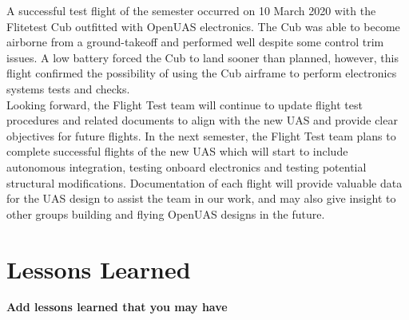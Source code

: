 \documentclass{article}
\begin{document}
A successful test flight of the semester occurred on 10 March 2020 with the Flitetest Cub outfitted with OpenUAS electronics. The Cub was able to become airborne from a ground-takeoff and performed well despite some control trim issues. A low battery forced the Cub to land sooner than planned, however, this flight confirmed the possibility of using the Cub airframe to perform electronics systems tests and checks.\\

Looking forward, the Flight Test team will continue to update flight test procedures and related documents to align with the new UAS and provide clear objectives for future flights. In the next semester, the Flight Test team plans to complete successful flights of the new UAS which will start to include autonomous integration, testing onboard electronics and testing potential structural modifications. Documentation of each flight will provide valuable data for the UAS design to assist the team in our work, and may also give insight to other groups building and flying OpenUAS designs in the future.\\



\section{Lessons Learned}

\textbf{Add lessons learned that you may have}
\end{document}
